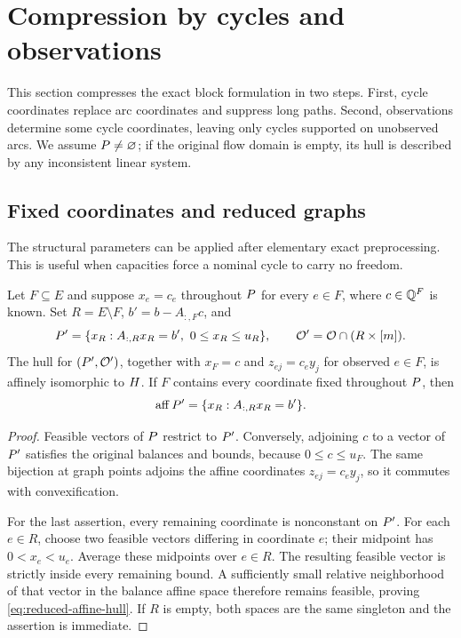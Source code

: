 \section{Compression by cycles and observations}\label{sec:compression}
This section compresses the exact block formulation in two steps. First,
cycle coordinates replace arc coordinates and suppress long paths. Second,
observations determine some cycle coordinates, leaving only cycles supported
on unobserved arcs. We assume $P\ne\varnothing$; if the original flow
domain is empty, its hull is described by any inconsistent linear system.

\subsection{Fixed coordinates and reduced graphs}\label{subsec:fixed-arcs}
The structural parameters can be applied after elementary exact preprocessing.
This is useful when capacities force a nominal cycle to carry no freedom.

\begin{lemma}\label{lem:fixed-arcs}
Let $F\subseteq E$ and suppose $x_e=c_e$ throughout $P$ for every
$e\in F$, where $c\in\mathbb Q^F$ is known. Set $R=E\setminus F$,
$b'=b-A_{:,F}c$, and
\[
 P'=\{x_R:A_{:,R}x_R=b',\ 0\le x_R\le u_R\},\qquad
 \mathcal O'=\mathcal O\cap(R\times[m]).
\]
The hull for $(P',\mathcal O')$, together with
$x_F=c$ and $z_{ej}=c_e y_j$ for observed $e\in F$, is affinely
isomorphic to $H$. If $F$ contains every coordinate fixed throughout
$P$, then
\begin{equation}\label{eq:reduced-affine-hull}
 \operatorname{aff}P'=\{x_R:A_{:,R}x_R=b'\}.
\end{equation}
\end{lemma}
\begin{proof}
Feasible vectors of $P$ restrict to $P'$. Conversely, adjoining
$c$ to a vector of $P'$ satisfies the original balances and bounds,
because $0\le c\le u_F$. The same bijection at graph points adjoins the
affine coordinates $z_{ej}=c_e y_j$, so it commutes with convexification.

For the last assertion, every remaining coordinate is nonconstant on
$P'$. For each $e\in R$, choose two feasible vectors differing in
coordinate $e$; their midpoint has $0<x_e<u_e$. Average these midpoints
over $e\in R$. The resulting feasible vector is strictly inside every
remaining bound. A sufficiently small relative neighborhood of that vector
in the balance affine space therefore remains feasible, proving
\eqref{eq:reduced-affine-hull}. If $R$ is empty, both spaces are the same
singleton and the assertion is immediate.
\end{proof}

